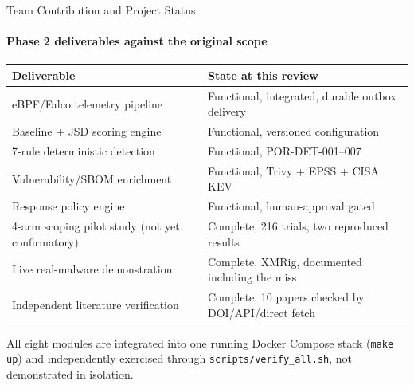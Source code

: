 \documentclass[aspectratio=169, 11pt]{beamer}
\begin{document}
\begin{frame}{Team Contribution and Project Status}
\framesubtitle{Phase 2 deliverables against the original scope}
\scriptsize
\begin{table}
    \centering
    \scriptsize
    \renewcommand{\arraystretch}{1.05}
    \begin{tabular}{|p{4.7cm}|p{6.3cm}|}
        \hline
        \textbf{Deliverable} & \textbf{State at this review} \\
        \hline
        eBPF/Falco telemetry pipeline & Functional, integrated, durable outbox delivery \\
        \hline
        Baseline + JSD scoring engine & Functional, versioned configuration \\
        \hline
        7-rule deterministic detection & Functional, POR-DET-001--007 \\
        \hline
        Vulnerability/SBOM enrichment & Functional, Trivy + EPSS + CISA KEV \\
        \hline
        Response policy engine & Functional, human-approval gated \\
        \hline
        4-arm scoping pilot study (not yet confirmatory) & Complete, 216 trials, two reproduced results \\
        \hline
        Live real-malware demonstration & Complete, XMRig, documented including the miss \\
        \hline
        Independent literature verification & Complete, 10 papers checked by DOI/API/direct fetch \\
        \hline
    \end{tabular}
\end{table}
All eight modules are integrated into one running Docker Compose stack
(\texttt{make up}) and independently exercised through
\texttt{scripts/verify\_all.sh}, not demonstrated in isolation.
\end{frame}

\end{document}
